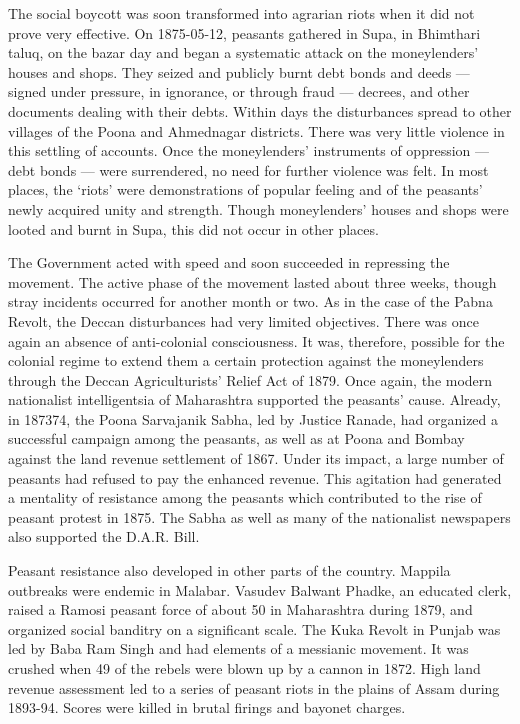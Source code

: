 The social boycott was soon transformed into agrarian riots when it did not prove very effective. On 1875-05-12, peasants gathered in Supa, in Bhimthari taluq, on the bazar day and began a systematic attack on the moneylenders' houses and shops. They seized and publicly burnt debt bonds and deeds — signed under pressure, in ignorance, or through fraud — decrees, and other documents dealing with their debts. Within days the disturbances spread to other villages of the Poona and Ahmednagar districts. There was very little violence in this settling of accounts. Once the moneylenders' instruments of oppression — debt bonds — were surrendered, no need for further violence was felt. In most places, the `riots' were demonstrations of popular feeling and of the peasants' newly acquired unity and strength. Though moneylenders' houses and shops were looted and burnt in Supa, this did not occur in other places.

The Government acted with speed and soon succeeded in repressing the movement. The active phase of the movement lasted about three weeks, though stray incidents occurred for another month or two. As in the case of the Pabna Revolt, the Deccan disturbances had very limited objectives. There was once again an absence of anti-colonial consciousness. It was, therefore, possible for the colonial regime to extend them a certain protection against the moneylenders through the Deccan Agriculturists' Relief Act of 1879. Once again, the modern nationalist intelligentsia of Maharashtra supported the peasants' cause. Already, in 1873­74, the Poona Sarvajanik Sabha, led by Justice Ranade, had organized a successful campaign among the peasants, as well as at Poona and Bombay against the land revenue settlement of 1867. Under its impact, a large number of peasants had refused to pay the enhanced revenue. This agitation had generated a mentality of resistance among the peasants which contributed to the rise of peasant protest in 1875. The Sabha as well as many of the nationalist newspapers also supported the D.A.R. Bill.

Peasant resistance also developed in other parts of the country. Mappila outbreaks were endemic in Malabar. Vasudev Balwant Phadke, an educated clerk, raised a Ramosi peasant force of about 50 in Maharashtra during 1879, and organized social banditry on a significant scale. The Kuka Revolt in Punjab was led by Baba Ram Singh and had elements of a messianic movement. It was crushed when 49 of the rebels were blown up by a cannon in 1872. High land revenue assessment led to a series of peasant riots in the plains of Assam during 1893-94. Scores were killed in brutal firings and bayonet charges.

